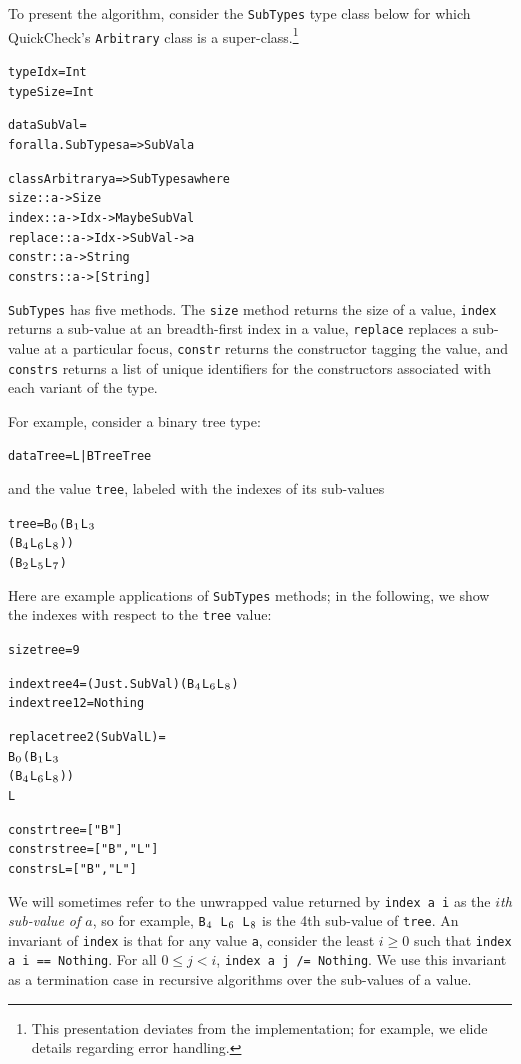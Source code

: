 \documentclass[10pt]{sigplanconf}
\newenvironment{code}{\begin{alltt}}{\end{alltt}}
\newcommand{\ttp}[1]{\texttt{#1}}
\newcommand{\sub}[1]{\(\sb{#1}\)}
\begin{document}
To present the algorithm, consider the \ttp{SubTypes} type class below for which
QuickCheck's \ttp{Arbitrary} class is a super-class.\footnote{This presentation
  deviates from the implementation; for example, we elide details regarding
  error handling.}
%
\begin{code}
type Idx = Int
type Size = Int

data SubVal =
  forall a. SubTypes a => SubVal a

class Arbitrary a => SubTypes a where
  size    :: a -> Size
  index   :: a -> Idx -> Maybe SubVal
  replace :: a -> Idx -> SubVal -> a
  constr  :: a -> String
  constrs :: a -> [String]
\end{code}
%
\noindent
\ttp{SubTypes} has five methods.  The \ttp{size} method returns the size of a
value, \ttp{index} returns a sub-value at an breadth-first index in a value,
\ttp{replace} replaces a sub-value at a particular focus, \ttp{constr} returns
the constructor tagging the value, and \ttp{constrs} returns a list of unique
identifiers for the constructors associated with each variant of the type.

For example, consider a binary tree type:
%
\begin{code}
data Tree = L | B Tree Tree
\end{code}
%
\noindent
and the value \ttp{tree}, labeled with the indexes of its sub-values
%
\begin{code}
tree = B\sub{0} (B\sub{1} L\sub{3}
             (B\sub{4} L\sub{6} L\sub{8}))
          (B\sub{2} L\sub{5} L\sub{7})
\end{code}
%
\noindent
Here are example applications of \ttp{SubTypes} methods; in the following, we
show the indexes with respect to the \ttp{tree} value:
%
\begin{code}
size tree = 9

index tree 4 = (Just . SubVal) (B\sub{4} L\sub{6} L\sub{8})
index tree 12 = Nothing

replace tree 2 (SubVal L) =
  B\sub{0} (B\sub{1} L\sub{3}
        (B\sub{4} L\sub{6} L\sub{8}))
     L

constr  tree = ["B"]
constrs tree = ["B", "L"]
constrs L    = ["B", "L"]
\end{code}
%
\noindent
We will sometimes refer to the unwrapped value returned by \ttp{index a i} as
the \emph{$i$th sub-value of $a$}, so for example, \ttp{B\sub{4} L\sub{6}
  L\sub{8}} is the 4th sub-value of \ttp{tree}.  An invariant of \ttp{index} is
that for any value \ttp{a}, consider the least $i \geq 0$ such that \ttp{index a
  i == Nothing}.  For all $0 \leq j < i$, \ttp{index a j /= Nothing}.  We use
this invariant as a termination case in recursive algorithms over the sub-values
of a value.
\end{document}
